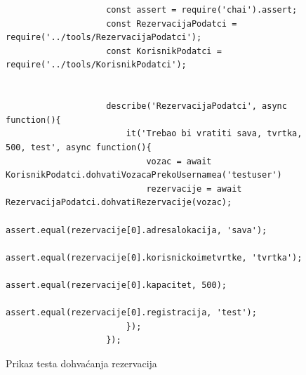 			\begin{figure}[H]
				
				\begin{lstlisting}
					const assert = require('chai').assert;
					const RezervacijaPodatci = require('../tools/RezervacijaPodatci');
					const KorisnikPodatci = require('../tools/KorisnikPodatci');
					
					
					describe('RezervacijaPodatci', async function(){
						it('Trebao bi vratiti sava, tvrtka, 500, test', async function(){
							vozac = await KorisnikPodatci.dohvatiVozacaPrekoUsernamea('testuser')
							rezervacije = await RezervacijaPodatci.dohvatiRezervacije(vozac);
							assert.equal(rezervacije[0].adresalokacija, 'sava');
							assert.equal(rezervacije[0].korisnickoimetvrtke, 'tvrtka');
							assert.equal(rezervacije[0].kapacitet, 500);
							assert.equal(rezervacije[0].registracija, 'test');
						});
					});
				\end{lstlisting}
			
				\centering
				\caption{Prikaz testa dohvaćanja rezervacija}
				\label{fig:test - user - dohvaćanje rezervacija}
			\end{figure}
				
